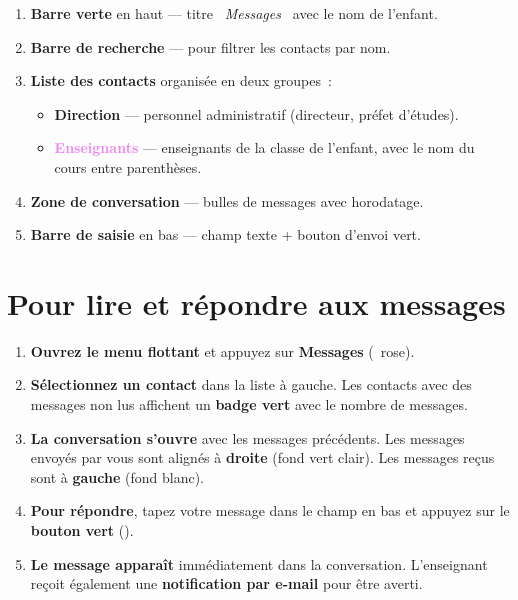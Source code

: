 \begin{enumerate}[leftmargin=1.2cm]
  \item \textbf{Barre verte} en haut --- titre \textit{\guillemotleft~Messages~\guillemotright} avec le nom de l'enfant.
  \item \textbf{Barre de recherche} --- pour filtrer les contacts par nom.
  \item \textbf{Liste des contacts} organis\'ee en deux groupes~:
  \begin{itemize}
    \item \textcolor{amber}{\textbf{Direction}} --- personnel administratif (directeur, pr\'efet d'\'etudes).
    \item \textcolor{violet}{\textbf{Enseignants}} --- enseignants de la classe de l'enfant, avec le nom du cours entre parenth\`eses.
  \end{itemize}
  \item \textbf{Zone de conversation} --- bulles de messages avec horodatage.
  \item \textbf{Barre de saisie} en bas --- champ texte + bouton d'envoi vert.
\end{enumerate}

\section{Pour lire et r\'epondre aux messages}

\begin{etape}[title=Proc\'edure : Lire et r\'epondre]
\begin{enumerate}[leftmargin=1.5cm,label=\textbf{\arabic*.},itemsep=12pt]
  \item \textbf{Ouvrez le menu flottant} et appuyez sur \textbf{Messages} (\faCommentDots\ rose).

  \item \textbf{S\'electionnez un contact} dans la liste \`a gauche. Les contacts avec des messages non lus affichent un \textbf{badge vert} avec le nombre de messages.

  \item \textbf{La conversation s'ouvre} avec les messages pr\'ec\'edents. Les messages envoy\'es par vous sont align\'es \`a \textbf{droite} (fond vert clair). Les messages re\c{c}us sont \`a \textbf{gauche} (fond blanc).

  \item \textbf{Pour r\'epondre}, tapez votre message dans le champ en bas et appuyez sur le \textbf{bouton vert} (\faPaperPlane).

  \item \textbf{Le message appara\^it} imm\'ediatement dans la conversation. L'enseignant re\c{c}oit \'egalement une \textbf{notification par e-mail} pour \^etre averti.
\end{enumerate}
\end{etape}

